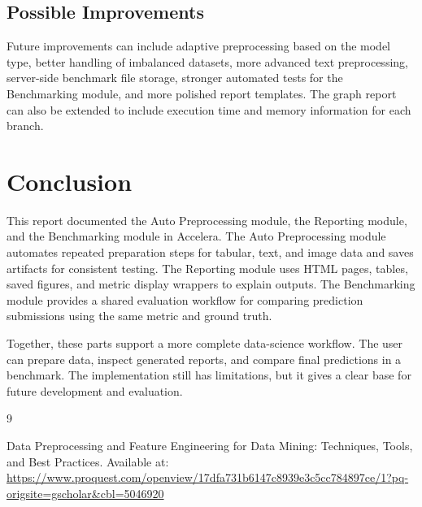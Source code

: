 \documentclass[12pt,a4paper,oneside]{report}
\newcommand{\systemname}{Accelera}
\begin{document}
\section{Possible Improvements}

Future improvements can include adaptive preprocessing based on the model type,
better handling of imbalanced datasets, more advanced text preprocessing,
server-side benchmark file storage, stronger automated tests for the
Benchmarking module, and more polished report templates. The graph report can also be
extended to include execution time and memory information for each branch.

\chapter{Conclusion}
\label{chap:conclusion}

This report documented the Auto Preprocessing module, the Reporting module,
and the Benchmarking module in \systemname{}. The Auto Preprocessing
module automates repeated preparation steps for tabular, text, and image data
and saves artifacts for consistent testing. The Reporting module uses HTML
pages, tables, saved figures, and metric display wrappers to explain outputs.
The Benchmarking module provides a shared
evaluation workflow for comparing prediction submissions using the same metric
and ground truth.

Together, these parts support a more complete data-science workflow. The user
can prepare data, inspect generated reports, and compare final predictions in a
benchmark. The implementation still has limitations, but it gives a clear base
for future development and evaluation.

\begin{thebibliography}{9}

Data Preprocessing and Feature Engineering for Data Mining: Techniques, Tools,
and Best Practices.
\newblock Available at:
\url{https://www.proquest.com/openview/17dfa731b6147c8939e3c5cc784897ce/1?pq-origsite=gscholar&cbl=5046920}

\end{thebibliography}
\end{document}
